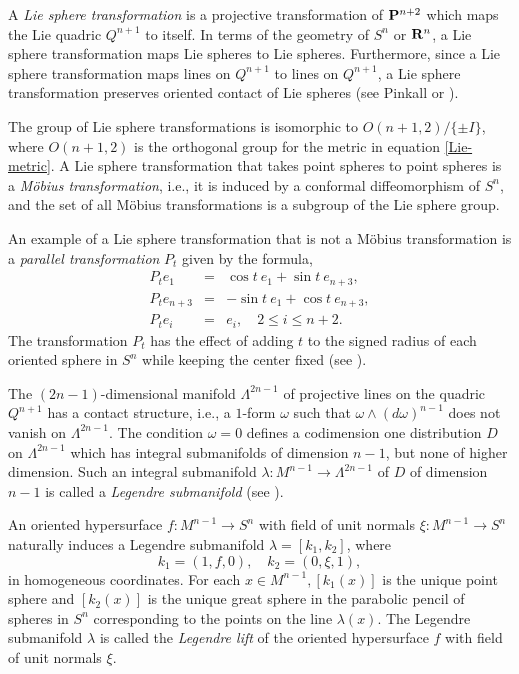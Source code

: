 \documentclass[12pt]{article}
\begin{document}
A {\em Lie sphere transformation} 
is a projective transformation of ${\bf P}^{n+2}$ which maps the Lie quadric $Q^{n+1}$
to itself.  In terms of the geometry of  $S^n$ or ${\bf R}^n$, 
a Lie sphere transformation maps Lie spheres to Lie spheres.
Furthermore, since a Lie sphere transformation maps lines on $Q^{n+1}$ to lines on $Q^{n+1}$, 
a Lie sphere transformation preserves oriented contact of Lie spheres  (see Pinkall \cite[p. 431]{P4}
or \cite[pp. 25--30]{Cec1}).

The group of Lie sphere transformations is
isomorphic to $O(n+1,2)/ \{ \pm I \}$, where $O(n+1,2)$
is the orthogonal group for the metric in equation \eqref{Lie-metric}.
A Lie sphere transformation that takes point spheres to point spheres is a {\em M\"{o}bius transformation}, i.e.,
it is induced by a conformal diffeomorphism of $S^n$, and the set of all M\"{o}bius transformations is a subgroup of the Lie sphere group.  

An example of a Lie sphere transformation that is not
a M\"{o}bius transformation is a {\em parallel transformation} $P_t$ given by the formula,
\begin{eqnarray}
\label{eq:3.4.9}
P_t e_1 & = & \cos t \ e_1 + \sin t \ e_{n+3}, \nonumber \\
P_t e_{n+3} & = & - \sin t \ e_1 + \cos t \ e_{n+3},\\
P_t e_i & = & e_i, \quad 2 \leq i \leq n+2. \nonumber
\end{eqnarray}
The transformation $P_t$ has the effect of adding $t$ to the signed radius
of each oriented sphere in $S^n$ while keeping the center
fixed (see \cite[pp. 25--49]{Cec1}). 




The $(2n-1)$-dimensional manifold $\Lambda^{2n-1}$ of projective lines on the quadric $Q^{n+1}$ has a 
contact structure, i.e., a
$1$-form $\omega$ such that $\omega \wedge (d\omega)^{n-1}$ does not vanish on $\Lambda^{2n-1}$.  The condition $\omega = 0$ defines a codimension one distribution $D$ on $\Lambda^{2n-1}$ which has 
integral submanifolds
of dimension $n-1$, but none of higher dimension.  Such an integral  submanifold 
$\lambda: M^{n-1} \rightarrow \Lambda^{2n-1}$ of $D$ of dimension $n-1$ is called a 
{\em Legendre submanifold} (see \cite[pp. 51--64]{Cec1}).

An oriented hypersurface $f:M^{n-1} \rightarrow S^n$ with field of unit
normals $\xi :M^{n-1} \rightarrow S^n$ naturally induces
a Legendre submanifold $\lambda = [k_1, k_2]$, where 
\begin{equation}
k_1 = (1,f,0), \quad k_2 = (0,\xi ,1),
\end{equation}
in homogeneous coordinates.
For each $x \in M^{n-1}, [k_1(x)]$ is the unique point sphere and
$[k_2 (x)]$ is the unique great sphere in the parabolic pencil of spheres in $S^n$ corresponding to 
the points on the line $\lambda (x)$.  The Legendre submanifold $\lambda$ is called the {\em Legendre lift}
of the oriented hypersurface $f$ with field of unit normals $\xi$.
\end{document}
